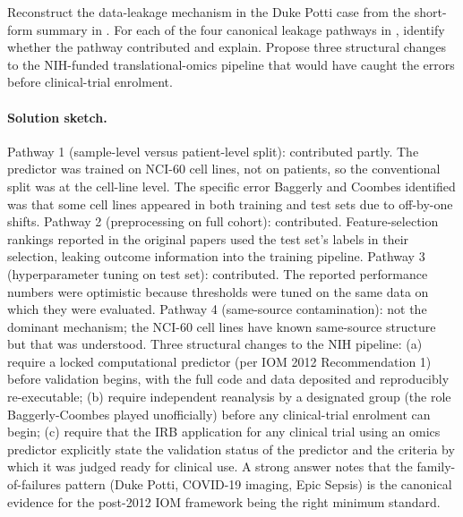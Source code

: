 \begin{exercise}
Reconstruct the data-leakage mechanism in the Duke Potti case from the
short-form summary in
. For each
of the four canonical leakage pathways in
, identify whether the pathway
contributed and explain. Propose three structural changes to the
NIH-funded translational-omics pipeline that would have caught the
errors before clinical-trial enrolment.

\paragraph{Solution sketch.}
Pathway 1 (sample-level versus patient-level split): contributed
partly. The predictor was trained on NCI-60 cell lines, not on
patients, so the conventional split was at the cell-line level. The
specific error Baggerly and Coombes identified was that some cell
lines appeared in both training and test sets due to off-by-one
shifts. Pathway 2 (preprocessing on full cohort): contributed.
Feature-selection rankings reported in the original papers used the
test set's labels in their selection, leaking outcome information
into the training pipeline. Pathway 3 (hyperparameter tuning on test
set): contributed. The reported performance numbers were optimistic
because thresholds were tuned on the same data on which they were
evaluated. Pathway 4 (same-source contamination): not the dominant
mechanism; the NCI-60 cell lines have known same-source structure but
that was understood. Three structural changes to the NIH pipeline:
(a) require a locked computational predictor (per IOM 2012
Recommendation 1) before validation begins, with the full code and
data deposited and reproducibly re-executable; (b) require independent
reanalysis by a designated group (the role Baggerly-Coombes played
unofficially) before any clinical-trial enrolment can begin; (c)
require that the IRB application for any clinical trial using an
omics predictor explicitly state the validation status of the
predictor and the criteria by which it was judged ready for clinical
use. A strong answer notes that the family-of-failures pattern (Duke
Potti, COVID-19 imaging, Epic Sepsis) is the canonical evidence for
the post-2012 IOM framework being the right minimum standard.
\end{exercise}

